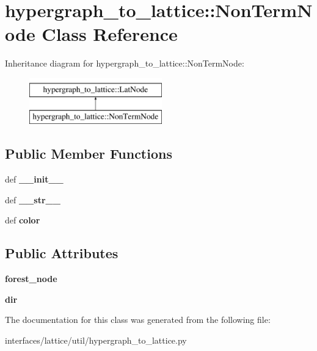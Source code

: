 \hypertarget{classhypergraph__to__lattice_1_1NonTermNode}{
\section{hypergraph\_\-to\_\-lattice::NonTermNode Class Reference}
\label{classhypergraph__to__lattice_1_1NonTermNode}
}
Inheritance diagram for hypergraph\_\-to\_\-lattice::NonTermNode:\begin{figure}[H]
\begin{center}
\leavevmode
\includegraphics[height=2cm]{classhypergraph__to__lattice_1_1NonTermNode}
\end{center}
\end{figure}
\subsection*{Public Member Functions}
\begin{DoxyCompactItemize}
\item 
\hypertarget{classhypergraph__to__lattice_1_1NonTermNode_ae51722728313146cbf0744ee89a48eba}{
def {\bfseries \_\-\_\-init\_\-\_\-}}
\label{classhypergraph__to__lattice_1_1NonTermNode_ae51722728313146cbf0744ee89a48eba}

\item 
\hypertarget{classhypergraph__to__lattice_1_1NonTermNode_a0390e322adda7d8befa2d78d671f2e23}{
def {\bfseries \_\-\_\-str\_\-\_\-}}
\label{classhypergraph__to__lattice_1_1NonTermNode_a0390e322adda7d8befa2d78d671f2e23}

\item 
\hypertarget{classhypergraph__to__lattice_1_1NonTermNode_a22e412fe2db4e6490cea31e56be2dc6a}{
def {\bfseries color}}
\label{classhypergraph__to__lattice_1_1NonTermNode_a22e412fe2db4e6490cea31e56be2dc6a}

\end{DoxyCompactItemize}
\subsection*{Public Attributes}
\begin{DoxyCompactItemize}
\item 
\hypertarget{classhypergraph__to__lattice_1_1NonTermNode_aed769cb6e411164a776daf5aee232b50}{
{\bfseries forest\_\-node}}
\label{classhypergraph__to__lattice_1_1NonTermNode_aed769cb6e411164a776daf5aee232b50}

\item 
\hypertarget{classhypergraph__to__lattice_1_1NonTermNode_a8674d7004d94aea2133bfb32dbf9da9e}{
{\bfseries dir}}
\label{classhypergraph__to__lattice_1_1NonTermNode_a8674d7004d94aea2133bfb32dbf9da9e}

\end{DoxyCompactItemize}


The documentation for this class was generated from the following file:\begin{DoxyCompactItemize}
\item 
interfaces/lattice/util/hypergraph\_\-to\_\-lattice.py\end{DoxyCompactItemize}
